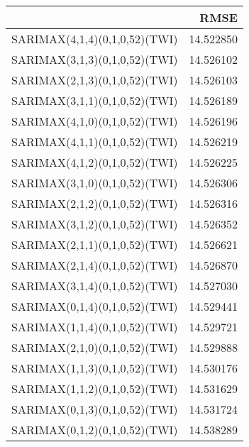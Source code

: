\begin{tabular}{lr}
\toprule
 & RMSE \\
\midrule
SARIMAX(4,1,4)(0,1,0,52)(TWI) & 14.522850 \\
SARIMAX(3,1,3)(0,1,0,52)(TWI) & 14.526102 \\
SARIMAX(2,1,3)(0,1,0,52)(TWI) & 14.526103 \\
SARIMAX(3,1,1)(0,1,0,52)(TWI) & 14.526189 \\
SARIMAX(4,1,0)(0,1,0,52)(TWI) & 14.526196 \\
SARIMAX(4,1,1)(0,1,0,52)(TWI) & 14.526219 \\
SARIMAX(4,1,2)(0,1,0,52)(TWI) & 14.526225 \\
SARIMAX(3,1,0)(0,1,0,52)(TWI) & 14.526306 \\
SARIMAX(2,1,2)(0,1,0,52)(TWI) & 14.526316 \\
SARIMAX(3,1,2)(0,1,0,52)(TWI) & 14.526352 \\
SARIMAX(2,1,1)(0,1,0,52)(TWI) & 14.526621 \\
SARIMAX(2,1,4)(0,1,0,52)(TWI) & 14.526870 \\
SARIMAX(3,1,4)(0,1,0,52)(TWI) & 14.527030 \\
SARIMAX(0,1,4)(0,1,0,52)(TWI) & 14.529441 \\
SARIMAX(1,1,4)(0,1,0,52)(TWI) & 14.529721 \\
SARIMAX(2,1,0)(0,1,0,52)(TWI) & 14.529888 \\
SARIMAX(1,1,3)(0,1,0,52)(TWI) & 14.530176 \\
SARIMAX(1,1,2)(0,1,0,52)(TWI) & 14.531629 \\
SARIMAX(0,1,3)(0,1,0,52)(TWI) & 14.531724 \\
SARIMAX(0,1,2)(0,1,0,52)(TWI) & 14.538289 \\
\bottomrule
\end{tabular}

